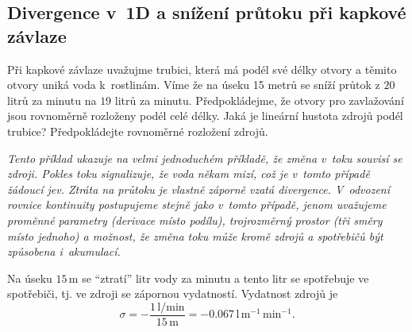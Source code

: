 \subsection{Divergence v 1D a snížení průtoku při kapkové závlaze}

Při kapkové závlaze uvažujme trubici, která má podél své délky otvory a těmito otvory uniká voda k rostlinám. Víme že na úseku 15 metrů se sníží průtok z $20$ litrů za minutu na $19$ litrů za minutu. Předpokládejme, že otvory pro zavlažování jsou rovnoměrně rozloženy podél celé délky. Jaká je lineární hustota zdrojů podél trubice? Předpokládejte rovnoměrné rozložení zdrojů.

\textit{Tento příklad ukazuje na velmi jednoduchém příkladě, že změna v toku souvisí se zdroji. Pokles toku signalizuje, že voda někam mizí, což je v tomto případě žádoucí jev. Ztráta na průtoku je vlastně záporně vzatá divergence. V odvození rovnice kontinuity postupujeme stejně jako v tomto případě, jenom uvažujeme proměnné parametry (derivace místo podílu), trojrozměrný prostor (tři směry místo jednoho) a možnost, že změna toku může kromě zdrojů a spotřebičů být způsobena i akumulací.}

\reseni
Na úseku $15\,\mathrm m$ se ``ztratí'' litr vody za minutu a tento litr se spotřebuje ve spotřebiči, tj. ve zdroji se zápornou vydatností. Vydatnost zdrojů je  $$\sigma = -\frac{1\,\mathrm{l}/\mathrm{min}}{15\,\mathrm m}=-0.067\,\mathrm l \,\mathrm{m}^{-1}\,\mathrm{min}^{-1}.$$
\konec

